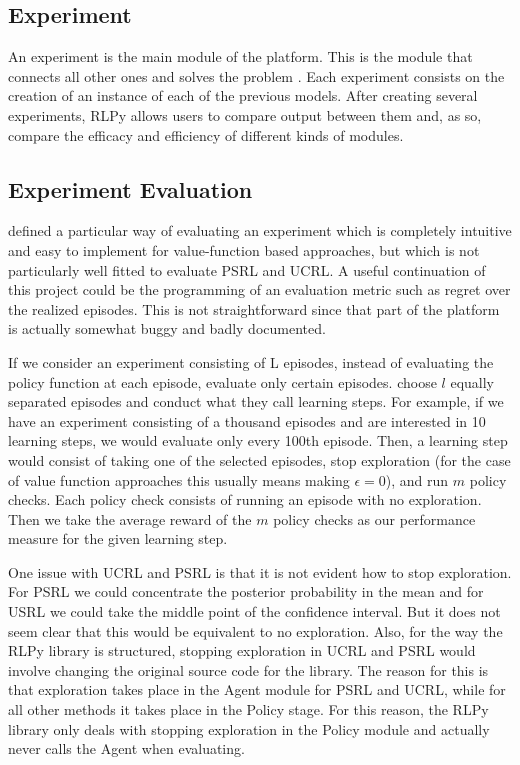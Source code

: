 \documentclass[12pt]{article}
\begin{document}
\subsection{Experiment}
An experiment is the main module of the platform. This is the module that connects all other ones and solves the problem \citep{RLPy}. Each experiment consists on the creation of an instance of each of the previous models. After creating several experiments, RLPy allows users to compare output between them and, as so, compare the efficacy and efficiency of different kinds of modules.

\subsection{Experiment Evaluation}
\cite{RLPy} defined a particular way of evaluating an experiment which is completely intuitive and easy to implement for value-function based approaches, but which is not particularly well fitted to evaluate PSRL and UCRL. A useful continuation of this project could be the programming of an evaluation metric such as regret over the realized episodes. This is not straightforward since that part of the platform is actually somewhat buggy and badly documented.

If we consider an experiment consisting of L episodes, instead of evaluating the policy function at each episode, \cite{RLPy} evaluate only certain episodes. \cite{RLPy} choose $l$ equally separated episodes and conduct what they call learning steps. For example, if we have an experiment consisting of a thousand episodes and are interested in 10 learning steps, we would evaluate only every 100th episode. Then, a learning step would consist of taking one of the selected episodes, stop exploration (for the case of value function approaches this usually means making $\epsilon=0$), and run $m$ policy checks. Each policy check consists of running an episode with no exploration. Then we take the average reward of the $m$ policy checks as our performance measure for the given learning step.

One issue with UCRL and PSRL is that it is not evident how to stop exploration. For PSRL we could concentrate the posterior probability in the mean and for USRL we could take the middle point of the confidence interval. But it does not seem clear that this would be equivalent to no exploration. Also, for the way the RLPy library is structured, stopping exploration in UCRL and PSRL would involve changing the original source code for the library. The reason for this is that exploration takes place in the Agent module for PSRL and UCRL, while for all other methods it takes place in the Policy stage. For this reason, the RLPy library only deals with stopping exploration in the Policy module and actually never calls the Agent when evaluating. 
\end{document}
